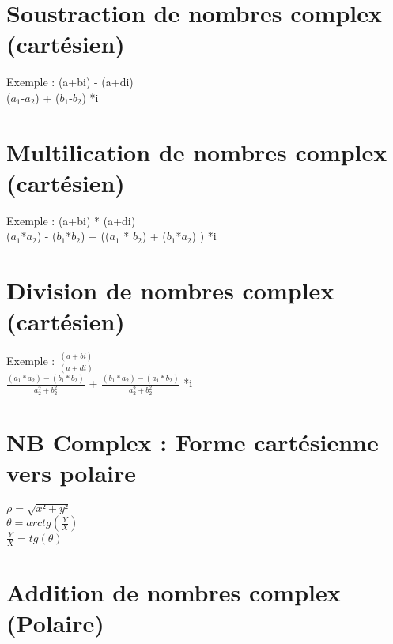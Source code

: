 \section{Soustraction de nombres complex (cartésien)}

Exemple : (a+bi) - (a+di) \\

($a_1$-$a_2$) + ($b_1$-$b_2$) *i \\

\vspace{4mm} %
\section{Multilication de nombres complex (cartésien)}

Exemple : (a+bi) * (a+di) \\

($a_1$*$a_2$) - ($b_1$*$b_2$) + (($a_1$ * $b_2$) + ($b_1$*$a_2$) ) *i \\

\vspace{4mm} %
\section{Division de nombres complex (cartésien)}

Exemple : $\frac{(a+bi)}{(a+di)}$ \\

$\frac{(a_1 * a_2) - (b_1*b_2)} {a_{2}^{2}+b_{2}^{2} } $ + $\frac{(b_1 * a_2) - (a_1*b_2)} {a_{2}^{2}+b_{2}^{2} } $ *i \\

\newpage
\vspace{4mm} %
\section{NB Complex : Forme cartésienne vers polaire}

$\rho = \sqrt{x²+y²}$ \\
$\theta = arctg(\frac{Y}{X})$ \\
$\frac{Y}{X} = tg(\theta)$ \\

\vspace{4mm} %
\section{Addition de nombres complex (Polaire)}

